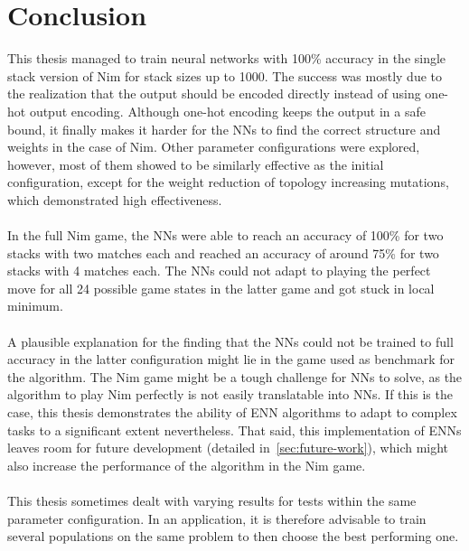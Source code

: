 \section{Conclusion}\label{sec:conclusion}
This thesis managed to train neural networks with 100\% accuracy in the single stack version of Nim for stack sizes up to 1000.
The success was mostly due to the realization that the output should be encoded directly instead of using one-hot output encoding.
Although one-hot encoding keeps the output in a safe bound, it finally makes it harder for the NNs to find the correct structure and weights in the case of Nim.
Other parameter configurations were explored, however, most of them showed to be similarly effective as the initial configuration, except for the weight reduction of topology increasing mutations, which demonstrated high effectiveness.
\\ \\
In the full Nim game, the NNs were able to reach an accuracy of 100\% for two stacks with two matches each and reached an accuracy of around 75\% for two stacks with 4 matches each.
The NNs could not adapt to playing the perfect move for all 24 possible game states in the latter game and got stuck in local minimum.
\\\\
A plausible explanation for the finding that the NNs could not be trained to full accuracy in the latter configuration might lie in the game used as benchmark for the algorithm.
The Nim game might be a tough challenge for NNs to solve, as the algorithm to play Nim perfectly is not easily translatable into NNs.
If this is the case, this thesis demonstrates the ability of ENN algorithms to adapt to complex tasks to a significant extent nevertheless.
That said, this implementation of ENNs leaves room for future development (detailed in~\ref{sec:future-work}), which might also increase the performance of the algorithm in the Nim game.
\\ \\
This thesis sometimes dealt with varying results for tests within the same parameter configuration.
In an application, it is therefore advisable to train several populations on the same problem to then choose the best performing one.

